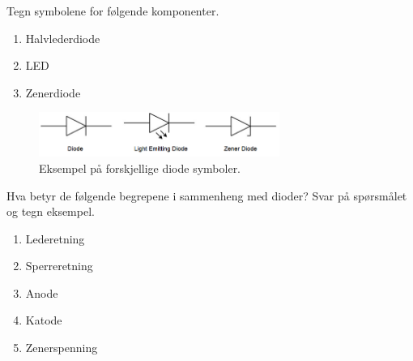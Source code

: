 
\begin{question}[name=Oppgave, topic=dioder]
	Tegn symbolene for følgende komponenter.
	\begin{enumerate}[label=\roman*]
		\item Halvlederdiode
		\item LED
		\item Zenerdiode
	\end{enumerate}
\end{question}

\vspace{0.5cm} %

\begin{solution}[name=Løsningsforslag oppgave]
	\begin{figure}[H]
		\centering
		\includegraphics[width=0.7\textwidth]{diode/figurer/oppgave1.png}
		\caption{Eksempel på forskjellige diode symboler.}
		\label{fig:diodeSymb}
	\end{figure}
\end{solution}

\vspace{0.5cm} %

\begin{question}[name=Oppgave, topic=dioder]
Hva betyr de følgende begrepene i sammenheng med dioder? Svar på spørsmålet og tegn eksempel.
	\begin{enumerate}[label=\roman*]
		\item Lederetning
		\item Sperreretning
		\item Anode
		\item Katode
		\item Zenerspenning
	\end{enumerate}
\end{question}

\vspace{0.5cm} %


